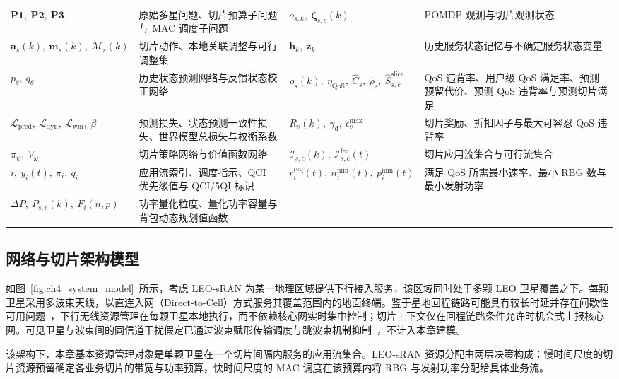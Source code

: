 \begin{longtable}[c]{@{}p{}p{}p{}p{}@{}}
  $\mathbf{P1},\ \mathbf{P2},\ \mathbf{P3}$ & 原始多星问题、切片预算子问题与 MAC 调度子问题 & $o_{s,k},\ \boldsymbol\zeta_{s,c}(k)$ & POMDP 观测与切片观测状态 \\
  $\mathbf a_s(k),\ \mathbf m_s(k),\ \mathcal M_s(k)$ & 切片动作、本地关联调整与可行调整集 & $\boldsymbol h_k,\ \boldsymbol z_k$ & 历史服务状态记忆与不确定服务状态变量 \\
  $p_\theta,\ q_\theta$ & 历史状态预测网络与反馈状态校正网络 & $\rho_s(k),\ \eta_{\mathrm{QoS}},\ \hat C_s,\ \hat\rho_s,\ \hat S_{s,c}^{\mathrm{slice}}$ & QoS 违背率、用户级 QoS 满足率、预测预留代价、预测 QoS 违背率与预测切片满足 \\
  $\mathcal L_{\mathrm{pred}},\ \mathcal L_{\mathrm{dyn}},\ \mathcal L_{\mathrm{wm}},\ \beta$ & 预测损失、状态预测一致性损失、世界模型总损失与权衡系数 & $R_s(k),\ \gamma_{\mathrm d},\ \epsilon_s^{\max}$ & 切片奖励、折扣因子与最大可容忍 QoS 违背率 \\
  $\pi_\psi,\ V_\omega$ & 切片策略网络与价值函数网络 & $\mathcal I_{s,c}(k),\ \mathcal I_{s,c}^{\mathrm{fea}}(t)$ & 切片应用流集合与可行流集合 \\
  $i,\ y_i(t),\ \pi_i,\ q_i$ & 应用流索引、调度指示、QCI 优先级值与 QCI/5QI 标识 & $r_i^{\mathrm{req}}(t),\ n_i^{\min}(t),\ p_i^{\min}(t)$ & 满足 QoS 所需最小速率、最小 RBG 数与最小发射功率 \\
  $\Delta P,\ \bar P_{s,c}(k),\ F_i(n,p)$ & 功率量化粒度、量化功率容量与背包动态规划值函数 &  &  \\
\end{longtable}

\subsection{网络与切片架构模型}
\label{subsec:ch4_network}

如图~\ref{fig:ch4_system_model}~所示，考虑 LEO-sRAN 为某一地理区域提供下行接入服务，该区域同时处于多颗 LEO 卫星覆盖之下。每颗卫星采用多波束天线，以直连入网（Direct-to-Cell）方式服务其覆盖范围内的地面终端。鉴于星地回程链路可能具有较长时延并存在间歇性可用问题~\cite{zhou-FeederLinkHandover-Sensors23}，下行无线资源管理在每颗卫星本地执行，而不依赖核心网实时集中控制；切片上下文仅在回程链路条件允许时机会式上报核心网。可见卫星与波束间的同信道干扰假定已通过波束赋形传输调度与跳波束机制抑制~\cite{wang-CollinearInterference-TCOM25}，不计入本章建模。

该架构下，本章基本资源管理对象是单颗卫星在一个切片间隔内服务的应用流集合。LEO-sRAN 资源分配由两层决策构成：慢时间尺度的切片资源预留确定各业务切片的带宽与功率预算，快时间尺度的 MAC 调度在该预算内将 RBG 与发射功率分配给具体业务流。

